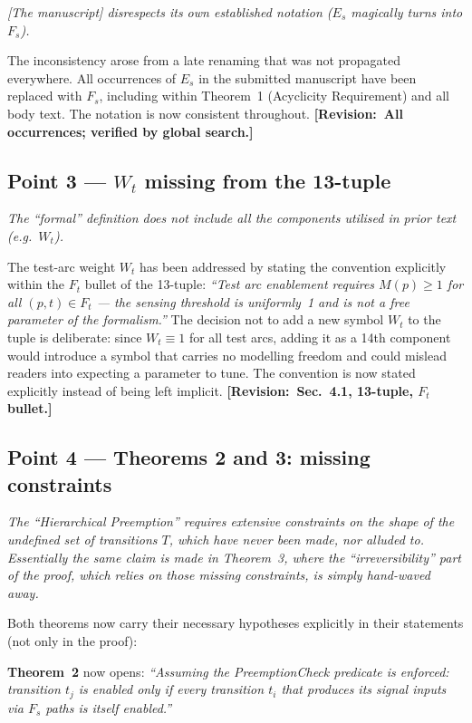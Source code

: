 \documentclass[11pt,letterpaper]{article}
\newcommand{\rquote}[1]{\begin{mdframed}[style=reviewquote]\textit{#1}\end{mdframed}}
\newcommand{\sref}[1]{\textbf{[Revision:~#1]}}
\begin{document}
\rquote{[The manuscript] disrespects its own established notation ($E_s$
magically turns into $F_s$).}

The inconsistency arose from a late renaming that was not propagated everywhere.
All occurrences of $E_s$ in the submitted manuscript have been replaced with
$F_s$, including within Theorem~1 (Acyclicity Requirement) and all body text.
The notation is now consistent throughout. \sref{All occurrences; verified by
global search.}

\subsection*{Point 3 --- $W_t$ missing from the 13-tuple}

\rquote{The ``formal'' definition does not include all the components utilised
in prior text (e.g.~$W_t$).}

The test-arc weight $W_t$ has been addressed by stating the convention
explicitly within the $F_t$ bullet of the 13-tuple: \textit{``Test arc
enablement requires $M(p) \geq 1$ for all $(p,t) \in F_t$ --- the sensing
threshold is uniformly~1 and is not a free parameter of the formalism.''}
The decision not to add a new symbol $W_t$ to the tuple is deliberate: since
$W_t \equiv 1$ for all test arcs, adding it as a 14th component would introduce
a symbol that carries no modelling freedom and could mislead readers into
expecting a parameter to tune. The convention is now stated explicitly instead
of being left implicit. \sref{Sec.~4.1, 13-tuple, $F_t$ bullet.}

\subsection*{Point 4 --- Theorems 2 and 3: missing constraints}

\rquote{The ``Hierarchical Preemption'' requires extensive constraints on the
shape of the undefined set of transitions $T$, which have never been made, nor
alluded to. Essentially the same claim is made in Theorem~3, where the
``irreversibility'' part of the proof, which relies on those missing constraints,
is simply hand-waved away.}

Both theorems now carry their necessary hypotheses explicitly in their
statements (not only in the proof):

\textbf{Theorem~2} now opens: \textit{``Assuming the PreemptionCheck predicate
is enforced: transition $t_j$ is enabled only if every transition $t_i$ that
produces its signal inputs via $F_s$ paths is itself enabled.''}
\end{document}
